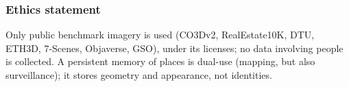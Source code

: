 \documentclass{article}
\begin{document}
\vspace{-3mm}
\subsubsection*{Ethics statement}
\vspace{-1mm}
Only public benchmark imagery is used (CO3Dv2, RealEstate10K, DTU, ETH3D,
7-Scenes, Objaverse, GSO), under its licenses; no data involving people is
collected. A persistent memory of places is dual-use (mapping, but also
surveillance); it stores geometry and appearance, not identities.




\appendix

\end{document}
